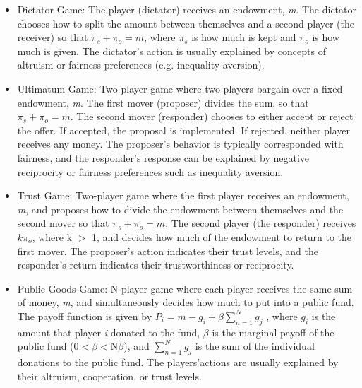 \documentclass[12pt]{article}
\begin{document}
\begin{itemize}

\item{Dictator Game}: The player (dictator) receives an endowment, \textit{m}. The dictator chooses how to split the amount between themselves and a second player (the receiver) so that \(\pi_{s} + \pi_{o} = \textit{m}\), where \(\pi_{s}\) is how much is kept and \(\pi_{o}\) is how much is given.
\subitem The dictator\rq s action is usually explained by concepts of altruism or fairness preferences (e.g. inequality aversion).
\item{Ultimatum Game}: Two-player game where two players bargain over a fixed endowment, \textit{m}. The first mover (proposer) divides the sum, so that \(\pi_{s} + \pi_{o} = m\). The second mover (responder) chooses to either accept or reject the offer. If accepted, the proposal is implemented. If rejected, neither player receives any money.
\subitem The proposer\rq s behavior is typically corresponded with fairness, and the responder\rq s response can be explained by negative reciprocity or fairness preferences such as inequality aversion.
\item{Trust Game}: Two-player game where the first player receives an endowment, \textit{m}, and proposes how to divide the endowment between themselves and the second mover so that \(\pi_{s} + \pi_{o} = m\). The second player (the responder) receives \(k\pi_{o}\), where k $>$ 1, and decides how much of the endowment to return to the first mover. 
\subitem The proposer\rq s action indicates their trust levels, and the responder\rq s return indicates their trustworthiness or reciprocity.
\item{Public Goods Game}: N-player game where each player receives the same sum of money, \textit{m}, and simultaneously decides how much to put into a public fund. The payoff function is given by \( P_{i} = m - g_{i} + \beta \sum_{n=1}^{N} g_{j} \) , where \(g_{i}\) is the amount that player \textit{i} donated to the fund, \(\beta\) is the marginal payoff of the public fund (0$<$\(\beta\)$<$N\(\beta\)), and \(\sum_{n=1}^{N}g_{j}\) is the sum of the individual donations to the public fund.
\subitem The players\rq actions are usually explained by their altruism, cooperation, or trust levels.
\end{itemize}
\end{document}
